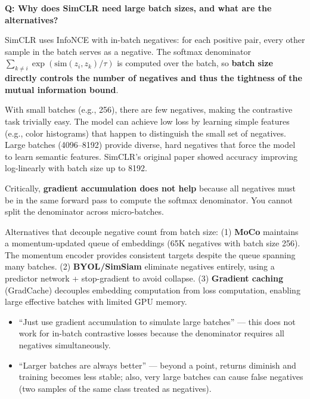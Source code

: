 \begin{interviewq}
\textbf{Q: Why does SimCLR need large batch sizes, and what are the alternatives?}

 \quad {} \quad \badgefreq{\freqhigh}

\stronganswer SimCLR uses InfoNCE with in-batch negatives: for each positive pair, every other sample in the batch serves as a negative. The softmax denominator $\sum_{k \neq i} \exp(\text{sim}(z_i, z_k)/\tau)$ is computed over the batch, so \textbf{batch size directly controls the number of negatives and thus the tightness of the mutual information bound}.

With small batches (e.g., 256), there are few negatives, making the contrastive task trivially easy. The model can achieve low loss by learning simple features (e.g., color histograms) that happen to distinguish the small set of negatives. Large batches (4096--8192) provide diverse, hard negatives that force the model to learn semantic features. SimCLR's original paper showed accuracy improving log-linearly with batch size up to 8192.

Critically, \textbf{gradient accumulation does not help} because all negatives must be in the same forward pass to compute the softmax denominator. You cannot split the denominator across micro-batches.

Alternatives that decouple negative count from batch size: (1) \textbf{MoCo} maintains a momentum-updated queue of embeddings (65K negatives with batch size 256). The momentum encoder provides consistent targets despite the queue spanning many batches. (2) \textbf{BYOL/SimSiam} eliminate negatives entirely, using a predictor network + stop-gradient to avoid collapse. (3) \textbf{Gradient caching} (GradCache) decouples embedding computation from loss computation, enabling large effective batches with limited GPU memory.

\redflags
\begin{itemize}
    \item ``Just use gradient accumulation to simulate large batches'' --- this does not work for in-batch contrastive losses because the denominator requires all negatives simultaneously.
    \item ``Larger batches are always better'' --- beyond a point, returns diminish and training becomes less stable; also, very large batches can cause false negatives (two samples of the same class treated as negatives).
\end{itemize}


\end{interviewq}
